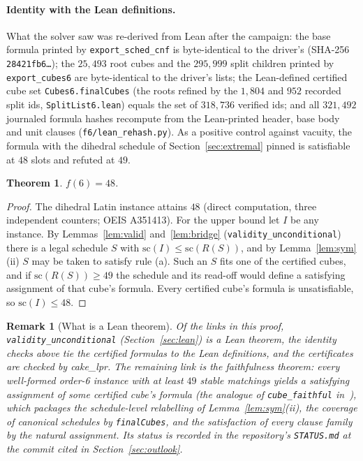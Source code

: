 \documentclass[11pt]{article}
\newtheorem{theorem}{Theorem}
\newtheorem{remark}{Remark}
\begin{document}
\paragraph{Identity with the Lean definitions.} What the solver saw was re-derived from Lean after
the campaign: the base formula printed by \texttt{export\_sched\_cnf} is byte-identical to the
driver's (SHA-256 \texttt{28421fb6\ldots}); the $25{,}493$ root cubes and the $295{,}999$ split
children printed by \texttt{export\_cubes6} are byte-identical to the driver's lists; the
Lean-defined certified cube set \texttt{Cubes6.finalCubes} (the roots refined by the $1{,}804$ and
$952$ recorded split ids, \texttt{SplitList6.lean}) equals the set of $318{,}736$ verified ids; and
all $321{,}492$ journaled formula hashes recompute from the Lean-printed header, base body and unit
clauses (\texttt{f6/lean\_rehash.py}). As a positive control against vacuity, the formula with the
dihedral schedule of Section~\ref{sec:extremal} pinned is satisfiable at $48$ slots and refuted at
$49$.

\begin{theorem}\label{thm:f6}
$f(6)=48$.
\end{theorem}

\begin{proof}
The dihedral Latin instance attains $48$ (direct computation, three independent counters; OEIS
A351413). For the upper bound let $I$ be any instance. By Lemmas~\ref{lem:valid}
and~\ref{lem:bridge} (\texttt{validity\_unconditional}) there is a legal schedule $S$ with
$\mathrm{sc}(I)\le\mathrm{sc}(R(S))$, and by Lemma~\ref{lem:sym}(ii) $S$ may be taken to satisfy
rule (a). Such an $S$ fits one of the certified cubes, and if $\mathrm{sc}(R(S))\ge 49$ the
schedule and its read-off would define a satisfying assignment of that cube's formula. Every
certified cube's formula is unsatisfiable, so $\mathrm{sc}(I)\le 48$.
\end{proof}

\begin{remark}[What is a Lean theorem]\label{rem:status}
Of the links in this proof, \texttt{validity\_unconditional} (Section~\ref{sec:lean}) is a Lean
theorem, the identity checks above tie the certified formulas to the Lean definitions, and the
certificates are checked by cake\_lpr. The remaining link is the faithfulness theorem: every
well-formed order-6 instance with at least $49$ stable matchings yields a satisfying assignment of
some certified cube's formula (the analogue of \texttt{cube\_faithful} in~\cite{f5paper}), which
packages the schedule-level relabelling of Lemma~\ref{lem:sym}(ii), the coverage of canonical
schedules by \texttt{finalCubes}, and the satisfaction of every clause family by the natural
assignment. Its status is recorded in the repository's \texttt{STATUS.md} at the commit cited in
Section~\ref{sec:outlook}.
\end{remark}
\end{document}
